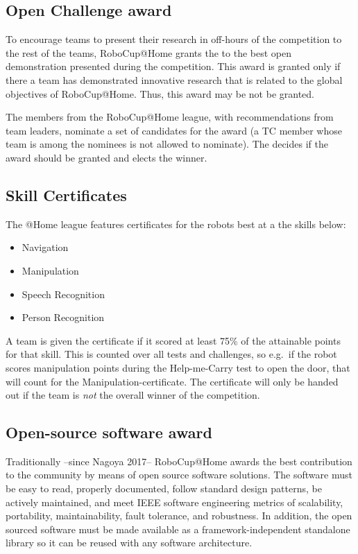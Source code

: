\subsection{Open Challenge award}
\label{award:oc}

To encourage teams to present their research in off-hours of the competition to the rest of the teams, RoboCup@Home grants the  to the best open demonstration presented during the competition. This award is granted only if there a team has demonstrated innovative research that is related to the global objectives of RoboCup@Home. Thus, this award may be not be granted.

The  members from the RoboCup@Home league, with recommendations from team leaders, nominate a set of candidates for the award (a TC member whose team is among the nominees is not allowed to nominate). The  decides if the award should be granted and elects the winner.

\subsection{Skill Certificates}
\label{award:skill}
The @Home league features certificates for the robots best at a the skills below:
\begin{itemize}
   \item Navigation
   \item Manipulation
   \item Speech Recognition
   \item Person Recognition
  \end{itemize}

A team is given the certificate if it scored at least 75\% of the attainable points for that skill.
This is counted over all tests and challenges, so e.g.~if the robot scores manipulation points during the Help-me-Carry test to open the door, that will count for the Manipulation-certificate.
The certificate will only be handed out if the team is \emph{not} the overall winner of the competition.


\subsection{Open-source software award}
\label{award:oss}
Traditionally --since Nagoya 2017-- RoboCup@Home awards the best contribution to the community by means of open source software solutions. The software must be easy to read, properly documented, follow standard design patterns, be actively maintained, and meet IEEE software engineering metrics of scalability, portability, maintainability, fault tolerance, and robustness. In addition, the open sourced software must be made available as a framework-independent standalone library so it can be reused with any software architecture.


